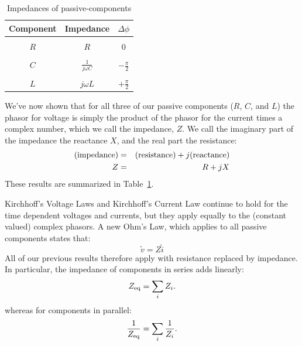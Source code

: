 \documentclass[12pt,oneside]{book}
\begin{document}
\begin{table}
\caption{Impedances of passive-components}
\label{tbl:impedance}
\begin{center}
\begin{tabular}{ccc}
Component & Impedance & $\Delta \phi$ \\
\hline
\\
$R$ & $R$ & 0 \\
\\
$C$ & $\displaystyle \frac{1}{j \omega C}$ & $\displaystyle -\frac{\pi}{2}$ \\
\\
$L$ & $j \omega L$ & $\displaystyle +\frac{\pi}{2}$ \\

\end{tabular}
\end{center}
\end{table}

We've now shown that for all three of our passive components ($R$, $C$, and $L$) the phasor for voltage is simply the product of the phasor for the current times a complex number, which we call the impedance, $Z$.  We call the imaginary part of the impedance the reactance $X$, and the real part the resistance:
\begin{eqnarray*}
({\rm impedance}) &=& ({\rm resistance}) + j ({\rm reactance} ) \\
Z &=& R + j X \\
\end{eqnarray*}
These results are summarized in Table~\ref{tbl:impedance}.  

Kirchhoff's Voltage Laws and Kirchhoff's Current Law continue to hold for the time dependent voltages and currents, but they apply equally to the (constant valued) complex phasors.  A new Ohm's Law, which applies to all passive components states that:
\begin{displaymath}
\tilde{v} = Z \tilde{i}
\end{displaymath}
All of our previous results therefore apply with resistance replaced by impedance.  In particular, the impedance of components in series adds linearly:
\begin{equation} \label{eqn:zseries}
Z_{\rm eq} = \sum_i Z_i. 
\end{equation}
whereas for components in parallel:
\begin{equation} \label{eqn:zseries}
\frac{1}{Z_{\rm eq}} = \sum_i \frac{1}{Z_i}. 
\end{equation}
\end{document}
